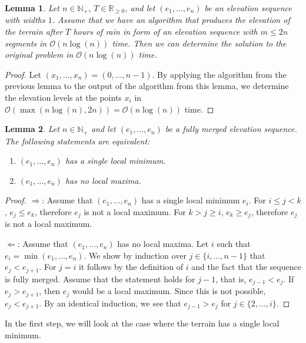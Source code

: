 \documentclass[11pt,a4paper]{article}
\newtheorem{lem}{Lemma}
\newcommand{\Np}{\mathbb{N}_+}
\newcommand{\bO}{\mathcal{O}}
\newcommand{\Rnn}{\mathbb{R}_{\ge0}}
\begin{document}
\begin{lem}
  Let $n\in\Np$, $T\in\Rnn$, and let $(e_1,\ldots,e_n)$ be an elevation sequence with widths $1$.
  Assume that we have an algorithm that produces the elevation of the terrain after $T$ hours of rain in form of an elevation sequence with $m \le 2n$ segments in $\bO(n\log(n))$ time.
  Then we can determine the solution to the original problem in $\bO(n\log(n))$ time.
\end{lem}

\begin{proof}
  Let $(x_1,\ldots,x_n) = (0,\ldots,n-1)$.
  By applying the algorithm from the previous lemma to the output of the algorithm from this lemma,
  we determine the elevation levels at the points $x_i$ in $\bO(\max(n\log(n), 2n)) = \bO(n\log(n))$ time.
\end{proof}

\begin{lem}
  \label{localmin}
  Let $n\in\Np$ and let $(e_1,\ldots,e_n)$ be a fully merged elevation sequence.
  The following statements are equivalent:
  \begin{enumerate}
    \item $(e_1,\ldots,e_n)$ has a single local minimum.
    \item $(e_1,\ldots,e_n)$ has no local maxima.
  \end{enumerate}
\end{lem}

\begin{proof}
  $\Rightarrow$: Assume that $(e_1,\ldots,e_n)$ has a single local minimum $e_i$.
  For $i \le j < k$, $e_j \le e_k$, therefore $e_j$ is not a local maximum.
  For $k > j \ge i$, $e_k \ge e_j$, therefore $e_j$ is not a local maximum.

  $\Leftarrow$: Assume that $(e_1,\ldots,e_n)$ has no local maxima.
  Let $i$ such that $e_i = \min(e_1,\ldots,e_n)$.
  We show by induction over $j \in \{i,\ldots,n-1\}$ that $e_j < e_{j+1}$.
  For $j = i$ it follows by the definition of $i$ and the fact that the sequence is fully merged.
  Assume that the statement holds for $j-1$, that is, $e_{j-1} < e_j$.
  If $e_j > e_{j+1}$, then $e_j$ would be a local maximum.
  Since this is not possible, $e_j < e_{j+1}$.
  By an identical induction, we see that $e_{j-1} > e_j$ for $j \in \{2,\ldots,i\}$.
\end{proof}

In the first step, we will look at the case where the terrain has a single local minimum.
\end{document}
